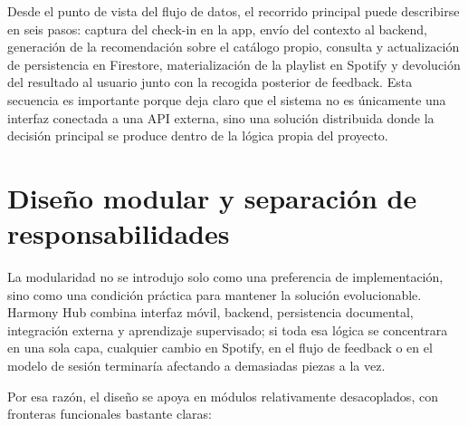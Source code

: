 Desde el punto de vista del flujo de datos, el recorrido principal puede
describirse en seis pasos: captura del check-in en la app, envío del contexto
al backend, generación de la recomendación sobre el catálogo propio, consulta y
actualización de persistencia en Firestore, materialización de la playlist en
Spotify y devolución del resultado al usuario junto con la recogida posterior
de feedback. Esta secuencia es importante porque deja claro que el sistema no
es únicamente una interfaz conectada a una API externa, sino una solución
distribuida donde la decisión principal se produce dentro de la lógica propia
del proyecto.

\section{Diseño modular y separación de responsabilidades}
\label{sec:diseno_modular}

La modularidad no se introdujo solo como una preferencia de implementación,
sino como una condición práctica para mantener la solución evolucionable.
Harmony Hub combina interfaz móvil, backend, persistencia documental,
integración externa y aprendizaje supervisado; si toda esa lógica se
concentrara en una sola capa, cualquier cambio en Spotify, en el flujo de
feedback o en el modelo de sesión terminaría afectando a demasiadas piezas a la
vez.

Por esa razón, el diseño se apoya en módulos relativamente desacoplados, con
fronteras funcionales bastante claras:

